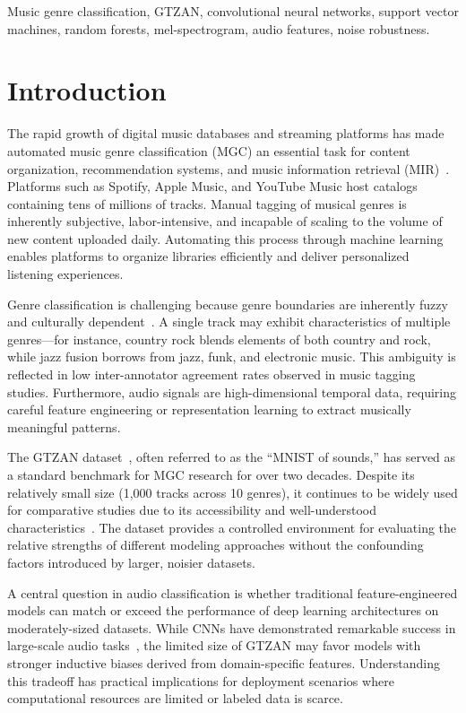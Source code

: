 \documentclass[10pt,journal]{IEEEtran}
\begin{document}
\begin{IEEEkeywords}
Music genre classification, GTZAN, convolutional neural networks, support vector machines, random forests, mel-spectrogram, audio features, noise robustness.
\end{IEEEkeywords}

\section{Introduction}

The rapid growth of digital music databases and streaming platforms has made automated music genre classification (MGC) an essential task for content organization, recommendation systems, and music information retrieval (MIR)~\cite{fu2011survey}. Platforms such as Spotify, Apple Music, and YouTube Music host catalogs containing tens of millions of tracks. Manual tagging of musical genres is inherently subjective, labor-intensive, and incapable of scaling to the volume of new content uploaded daily. Automating this process through machine learning enables platforms to organize libraries efficiently and deliver personalized listening experiences.

Genre classification is challenging because genre boundaries are inherently fuzzy and culturally dependent~\cite{muller2011signal}. A single track may exhibit characteristics of multiple genres---for instance, country rock blends elements of both country and rock, while jazz fusion borrows from jazz, funk, and electronic music. This ambiguity is reflected in low inter-annotator agreement rates observed in music tagging studies. Furthermore, audio signals are high-dimensional temporal data, requiring careful feature engineering or representation learning to extract musically meaningful patterns.

The GTZAN dataset~\cite{tzanetakis2002musical}, often referred to as the ``MNIST of sounds,'' has served as a standard benchmark for MGC research for over two decades. Despite its relatively small size (1,000 tracks across 10 genres), it continues to be widely used for comparative studies due to its accessibility and well-understood characteristics~\cite{sturm2013gtzan}. The dataset provides a controlled environment for evaluating the relative strengths of different modeling approaches without the confounding factors introduced by larger, noisier datasets.

A central question in audio classification is whether traditional feature-engineered models can match or exceed the performance of deep learning architectures on moderately-sized datasets. While CNNs have demonstrated remarkable success in large-scale audio tasks~\cite{hershey2017cnn}, the limited size of GTZAN may favor models with stronger inductive biases derived from domain-specific features. Understanding this tradeoff has practical implications for deployment scenarios where computational resources are limited or labeled data is scarce.
\end{document}
